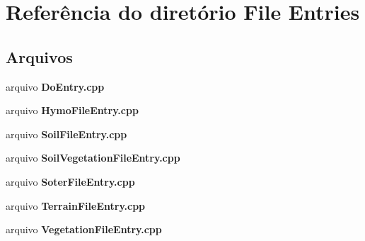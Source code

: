 \section{Referência do diretório File Entries}
\label{dir_bc9752da31c798aa601b39c97a2d4b3f}
\subsection*{Arquivos}
\begin{DoxyCompactItemize}
\item 
arquivo {\bf Do\+Entry.\+cpp}
\item 
arquivo {\bf Hymo\+File\+Entry.\+cpp}
\item 
arquivo {\bf Soil\+File\+Entry.\+cpp}
\item 
arquivo {\bf Soil\+Vegetation\+File\+Entry.\+cpp}
\item 
arquivo {\bf Soter\+File\+Entry.\+cpp}
\item 
arquivo {\bf Terrain\+File\+Entry.\+cpp}
\item 
arquivo {\bf Vegetation\+File\+Entry.\+cpp}
\end{DoxyCompactItemize}
